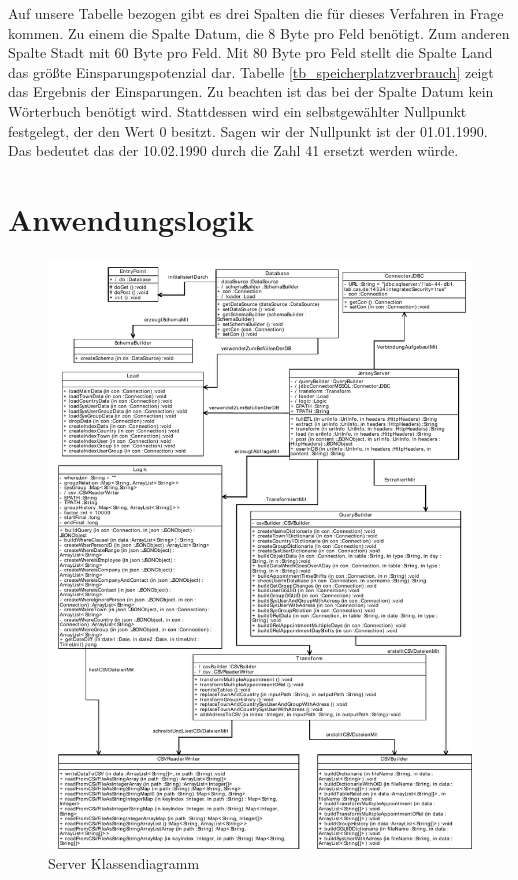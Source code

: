 Auf unsere Tabelle bezogen gibt es drei Spalten die für dieses Verfahren in Frage kommen. Zu einem die Spalte Datum, die 8 Byte pro Feld benötigt. Zum anderen Spalte Stadt mit 60 Byte pro Feld. Mit 80 Byte pro Feld stellt die Spalte Land das größte Einsparungspotenzial dar. Tabelle \ref{tb_speicherplatzverbrauch} zeigt das Ergebnis der Einsparungen. Zu beachten ist das bei der Spalte Datum kein Wörterbuch benötigt wird. Stattdessen wird ein selbstgewählter Nullpunkt festgelegt, der den Wert 0 besitzt. Sagen wir der Nullpunkt ist der 01.01.1990. Das bedeutet das der 10.02.1990 durch die Zahl 41 ersetzt werden würde.    


\section{Anwendungslogik}

\begin{figure}[htbp]
\begin{center}
\includegraphics[width=1.0\textwidth]{pics/ServerKlassendiagramm.pdf}
\caption{Server Klassendiagramm}
\label{umsetzung_klassendiagramm_server}
\end{center}
\end{figure}

